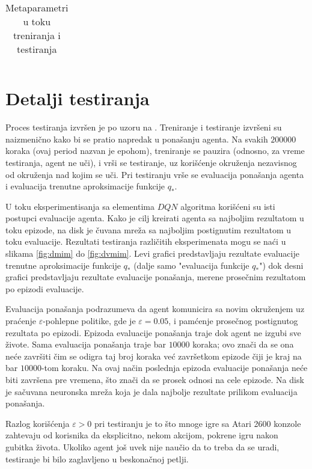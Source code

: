 \begin{table}
{\begin{tabularx}{\textwidth}{|l|c|X|}
\end{tabularx} }
\caption{Metaparametri u toku treniranja i testiranja}
\label{tbl:metaparametri}
\end{table}

\section{Detalji testiranja}
\label{sec:testiranje}

Proces testiranja izvršen je po uzoru na \cite{dqn_mnih}. Treniranje i testiranje izvršeni su naizmenično kako bi se pratio napredak u ponašanju agenta. Na svakih $200000$ koraka (ovaj period nazvan je epohom), treniranje se pauzira (odnosno, za vreme testiranja, agent ne uči), i vrši se testiranje, uz korišćenje okruženja nezavisnog od okruženja nad kojim se uči. Pri testiranju vrše se evaluacija ponašanja agenta i evaluacija trenutne aproksimacije funkcije $q_*$. 
\par 
U toku eksperimentisanja sa elementima $DQN$ algoritma korišćeni su isti postupci evaluacije agenta. Kako je cilj kreirati agenta sa najboljim rezultatom u toku epizode, na disk je čuvana mreža sa najboljim postignutim rezultatom u toku evaluacije. Rezultati testiranja različitih eksperimenata mogu se naći u slikama \ref{fig:dmim} do \ref{fig:dvmim}. Levi grafici predstavljaju rezultate evaluacije trenutne aproksimacije funkcije $q_*$ (dalje samo "evaluacija funkcije $q_*$") dok desni grafici predstavljaju rezultate evaluacije ponašanja, merene prosečnim rezultatom po epizodi evaluacije. 
\par 
Evaluacija ponašanja podrazumeva da agent komunicira sa novim okruženjem uz praćenje $\varepsilon$-pohlepne politike, gde je $\varepsilon=0.05$, i pamćenje prosečnog postignutog rezultata po epizodi. Epizoda evaluacije ponašanja traje dok agent ne izgubi sve živote. Sama evaluacija ponašanja traje bar $10000$ koraka; ovo znači da se ona neće završiti čim se odigra taj broj koraka već završetkom epizode čiji je kraj na bar $10000$-tom koraku. Na ovaj način poslednja epizoda evaluacije ponašanja neće biti završena pre vremena, što znači da se prosek odnosi na cele epizode. Na disk je sačuvana neuronska mreža koja je dala najbolje rezultate prilikom evaluacija ponašanja. 
\par  
Razlog korišćenja $\varepsilon > 0$ pri testiranju je to što mnoge igre sa Atari 2600 konzole zahtevaju od korisnika da eksplicitno, nekom akcijom, pokrene igru nakon gubitka života. Ukoliko agent još uvek nije naučio da to treba da se uradi, testiranje bi bilo zaglavljeno u beskonačnoj petlji.
